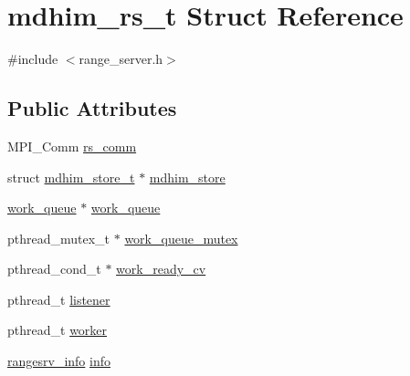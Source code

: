 \hypertarget{structmdhim__rs__t}{\section{mdhim\-\_\-rs\-\_\-t Struct Reference}
\label{d3/d34/structmdhim__rs__t}
}


{\ttfamily \#include $<$range\-\_\-server.\-h$>$}

\subsection*{Public Attributes}
\begin{DoxyCompactItemize}
\item 
M\-P\-I\-\_\-\-Comm \hyperlink{structmdhim__rs__t_a0ed34bdf133e1d59d83d44d0fda49683}{rs\-\_\-comm}
\item 
struct \hyperlink{structmdhim__store__t}{mdhim\-\_\-store\-\_\-t} $\ast$ \hyperlink{structmdhim__rs__t_aa393b01287a2253acff72c03cc5a83c5}{mdhim\-\_\-store}
\item 
\hyperlink{structwork__queue}{work\-\_\-queue} $\ast$ \hyperlink{structmdhim__rs__t_ab9b9e9145d08a9311917f42719937acc}{work\-\_\-queue}
\item 
pthread\-\_\-mutex\-\_\-t $\ast$ \hyperlink{structmdhim__rs__t_ab2c8635cf5b4ab05bdf8385960e3c490}{work\-\_\-queue\-\_\-mutex}
\item 
pthread\-\_\-cond\-\_\-t $\ast$ \hyperlink{structmdhim__rs__t_ab62cc2fae8553bb08e04f4365a94ec93}{work\-\_\-ready\-\_\-cv}
\item 
pthread\-\_\-t \hyperlink{structmdhim__rs__t_a993ccccd48dfdf22dd1ced2578ed15e2}{listener}
\item 
pthread\-\_\-t \hyperlink{structmdhim__rs__t_a0d5b280f18a5ff536779911d65a50529}{worker}
\item 
\hyperlink{structrangesrv__info}{rangesrv\-\_\-info} \hyperlink{structmdhim__rs__t_a23b6bfa000c31bbee0e71c4b6fbed2e9}{info}
\end{DoxyCompactItemize}


